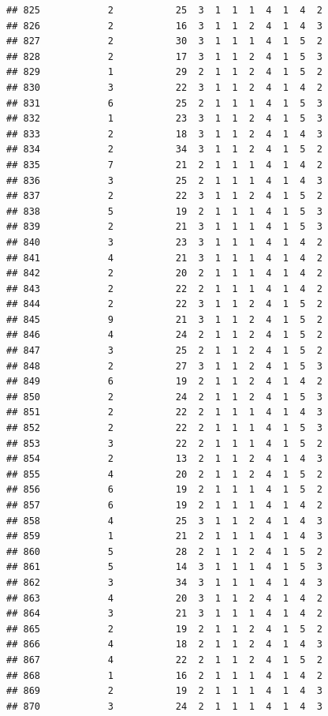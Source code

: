 \documentclass[12pt,]{krantz}
\theoremstyle{definition}
\theoremstyle{definition}
\theoremstyle{remark}
\begin{document}
\begin{verbatim}
## 825            2           25  3  1  1  1  4  1  4  2
## 826            2           16  3  1  1  2  4  1  4  3
## 827            2           30  3  1  1  1  4  1  5  2
## 828            2           17  3  1  1  2  4  1  5  3
## 829            1           29  2  1  1  2  4  1  5  2
## 830            3           22  3  1  1  2  4  1  4  2
## 831            6           25  2  1  1  1  4  1  5  3
## 832            1           23  3  1  1  2  4  1  5  3
## 833            2           18  3  1  1  2  4  1  4  3
## 834            2           34  3  1  1  2  4  1  5  2
## 835            7           21  2  1  1  1  4  1  4  2
## 836            3           25  2  1  1  1  4  1  4  3
## 837            2           22  3  1  1  2  4  1  5  2
## 838            5           19  2  1  1  1  4  1  5  3
## 839            2           21  3  1  1  1  4  1  5  3
## 840            3           23  3  1  1  1  4  1  4  2
## 841            4           21  3  1  1  1  4  1  4  2
## 842            2           20  2  1  1  1  4  1  4  2
## 843            2           22  2  1  1  1  4  1  4  2
## 844            2           22  3  1  1  2  4  1  5  2
## 845            9           21  3  1  1  2  4  1  5  2
## 846            4           24  2  1  1  2  4  1  5  2
## 847            3           25  2  1  1  2  4  1  5  2
## 848            2           27  3  1  1  2  4  1  5  3
## 849            6           19  2  1  1  2  4  1  4  2
## 850            2           24  2  1  1  2  4  1  5  3
## 851            2           22  2  1  1  1  4  1  4  3
## 852            2           22  2  1  1  1  4  1  5  3
## 853            3           22  2  1  1  1  4  1  5  2
## 854            2           13  2  1  1  2  4  1  4  3
## 855            4           20  2  1  1  2  4  1  5  2
## 856            6           19  2  1  1  1  4  1  5  2
## 857            6           19  2  1  1  1  4  1  4  2
## 858            4           25  3  1  1  2  4  1  4  3
## 859            1           21  2  1  1  1  4  1  4  3
## 860            5           28  2  1  1  2  4  1  5  2
## 861            5           14  3  1  1  1  4  1  5  3
## 862            3           34  3  1  1  1  4  1  4  3
## 863            4           20  3  1  1  2  4  1  4  2
## 864            3           21  3  1  1  1  4  1  4  2
## 865            2           19  2  1  1  2  4  1  5  2
## 866            4           18  2  1  1  2  4  1  4  3
## 867            4           22  2  1  1  2  4  1  5  2
## 868            1           16  2  1  1  1  4  1  4  2
## 869            2           19  2  1  1  1  4  1  4  3
## 870            3           24  2  1  1  1  4  1  4  3

\end{verbatim}
\end{document}
